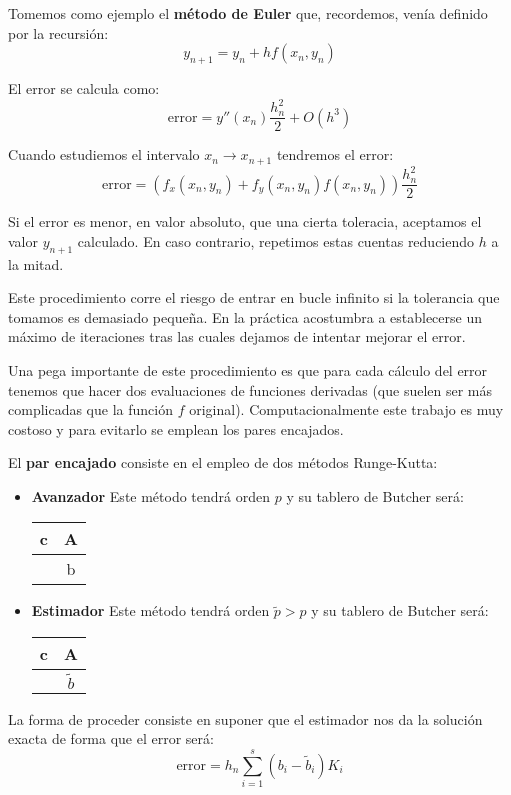 Tomemos como ejemplo el \textbf{método de Euler} que, recordemos, venía definido por la recursión:
\[y_{n+1} = y_n + h f(x_n,y_n)\]

El error se calcula como:
\[\text{error} = y''(x_n)\frac{h_n^2}{2}+O(h^3)\]

Cuando estudiemos el intervalo $x_n \to x_{n+1}$ tendremos el error:
\[\text{error} = \left(f_x(x_n,y_n)+f_y(x_n,y_n)f(x_n,y_n) \right)\frac{h_n^2}{2}\]

Si el error es menor, en valor absoluto, que una cierta toleracia, aceptamos el valor $y_{n+1}$ calculado. En caso contrario, repetimos estas cuentas reduciendo $h$ a la mitad.

\obs Este procedimiento corre el riesgo de entrar en bucle infinito si la tolerancia que tomamos es demasiado pequeña. En la práctica acostumbra a establecerse un máximo de iteraciones tras las cuales dejamos de intentar mejorar el error.

Una pega importante de este procedimiento es que para cada cálculo del error tenemos que hacer dos evaluaciones de funciones derivadas (que suelen ser más complicadas que la función $f$ original). Computacionalmente este trabajo es muy costoso y para evitarlo se emplean los pares encajados.

El \textbf{par encajado} consiste en el empleo de dos métodos Runge-Kutta:
\begin{itemize}
\item \textbf{Avanzador}
Este método tendrá orden $p$ y su tablero de Butcher será:

\begin{center}
\begin{tabular}{c|c}
c & A \\
\hline
 & b\\
\end{tabular}
\end{center}


\item \textbf{Estimador}
Este método tendrá orden $\tilde{p}>p$ y su tablero de Butcher será:

\begin{center}
\begin{tabular}{c|c}
c & A \\
\hline
 & $\tilde{b}$\\
\end{tabular}
\end{center}
\end{itemize}

La forma de proceder consiste en suponer que el estimador nos da la solución exacta de forma que el error será:
\[\text{error} = h_n \sum_{i=1}^s(b_i-\tilde{b}_i)K_i\]

